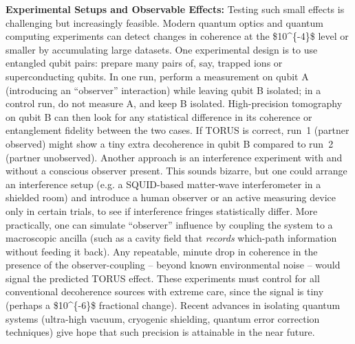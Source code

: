 \documentclass[
]{article}
\begin{document}
\textbf{Experimental Setups and Observable Effects:} Testing such small
effects is challenging but increasingly feasible. Modern quantum optics
and quantum computing experiments can detect changes in coherence at the
\$10\^{}\{-4\}\$ level or smaller by accumulating large datasets. One
experimental design is to use entangled qubit pairs: prepare many pairs
of, say, trapped ions or superconducting qubits. In one run, perform a
measurement on qubit A (introducing an ``observer'' interaction) while
leaving qubit B isolated; in a control run, do not measure A, and keep B
isolated. High-precision tomography on qubit B can then look for any
statistical difference in its coherence or entanglement fidelity between
the two cases. If TORUS is correct, run~1 (partner observed) might show
a tiny extra decoherence in qubit B compared to run~2 (partner
unobserved\hspace{0pt}). Another approach is an interference experiment
with and without a conscious observer present. This sounds bizarre, but
one could arrange an interference setup (e.g. a SQUID-based matter-wave
interferometer in a shielded room) and introduce a human observer or an
active measuring device only in certain trials, to see if interference
fringes statistically differ\hspace{0pt}. More practically, one can
simulate ``observer'' influence by coupling the system to a macroscopic
ancilla (such as a cavity field that \emph{records} which-path
information without feeding it back)\hspace{0pt}. Any repeatable, minute
drop in coherence in the presence of the observer-coupling -- beyond
known environmental noise -- would signal the predicted TORUS effect.
These experiments must control for all conventional decoherence sources
with extreme care, since the signal is tiny (perhaps a \$10\^{}\{-6\}\$
fractional change\hspace{0pt}). Recent advances in isolating quantum
systems (ultra-high vacuum, cryogenic shielding, quantum error
correction techniques) give hope that such precision is attainable in
the near future.
\end{document}
